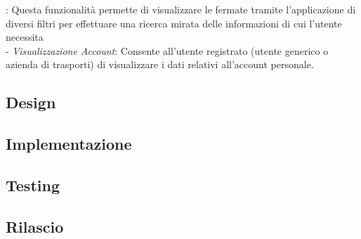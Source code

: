 : Questa funzionalit\`{a} permette di visualizzare le fermate tramite l’applicazione di diversi filtri per effettuare una ricerca mirata delle informazioni di cui l’utente necessita\\

 - \emph{Visualizzazione Account}: Consente all'utente registrato (utente generico o azienda di trasporti) di visualizzare i dati relativi all’account personale.\\


\subsection{Design}

\subsection{Implementazione}

\subsection{Testing}

\subsection{Rilascio}